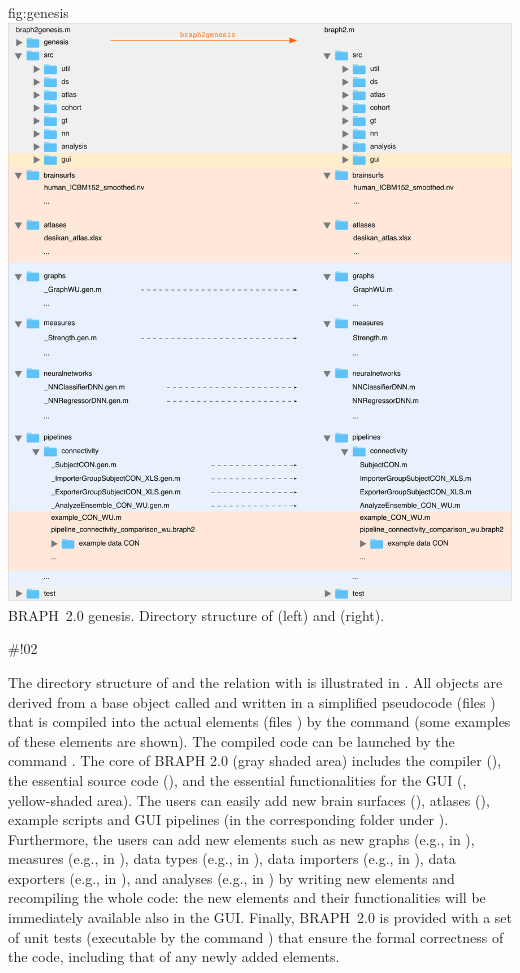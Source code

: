 \documentclass{tufte-handout}
\begin{document}
	{fig:genesis}
	{\includegraphics{../braph2genesis.png}}
	{BRAPH~2.0 genesis.}
	{
	Directory structure of  (left) and  (right).
	}

#!02

The directory structure of  and the relation with  is illustrated in .
All objects are derived from a base object called  and written in a simplified pseudocode (files ) that is compiled into the actual elements (files ) by the command  (some examples of these elements are shown).
The compiled code can be launched by the command .
The core of BRAPH 2.0 (gray shaded area) includes the compiler (), the essential source code (), and the essential functionalities for the GUI (, yellow-shaded area).
The users can easily add new brain surfaces (), atlases (), example scripts and GUI pipelines (in the corresponding folder under ).
Furthermore, the users can add new elements such as new graphs (e.g.,  in ), measures (e.g.,  in ), data types (e.g.,  in ), data importers (e.g.,  in ), data exporters (e.g.,  in ), and analyses (e.g.,  in ) by writing new elements and recompiling the whole code: the new elements and their functionalities will be immediately available also in the GUI.
Finally, BRAPH~2.0 is provided with a set of unit tests (executable by the command ) that ensure the formal correctness of the code, including that of any newly added elements.
\end{document}
